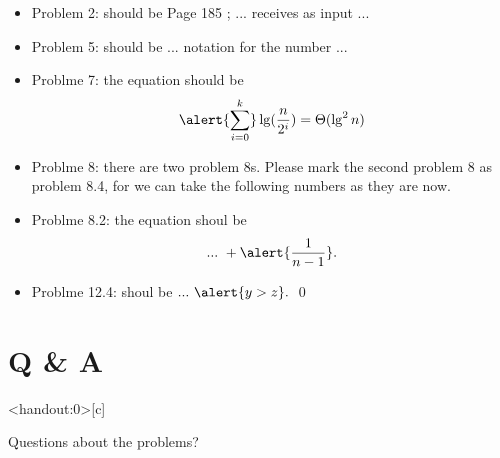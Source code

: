 \documentclass{beamer}
\begin{document}
    \begin{frame}[c,shrink]{\subsecname}
        \begin{itemize}
        \item
Problem 2: should be Page \alert{185} ; ... receives \alert{as} input ...
        \item
Problem 5: should be ... notation \alert{for} the number ...
        \item
Problme 7: the equation should be \[\alert{\sum^k_{i=0}}\lg(\frac{n}{2^i})=\Theta(\lg^2n)\]
        \item
Problme 8: there are \alert{two} problem 8s. Please mark \alert{the second problem 8} as \alert{problem 8.4}, for we can take the following numbers as they are now.
        \item
Problme 8.2: the equation shoul be \[...\ +\alert{\frac{1}{n-1}}.\]
        \item
Problme 12.4: shoul be $...\ \alert{y>z}.$ \qed
        \end{itemize}
    \end{frame}
        
        
        
\section*{Q \& A}

    \begin{frame}<handout:0>[c]{\secname}
        \centerline{\Huge{Questions about the problems?}}
    \end{frame}
    
    
    
\end{document}
